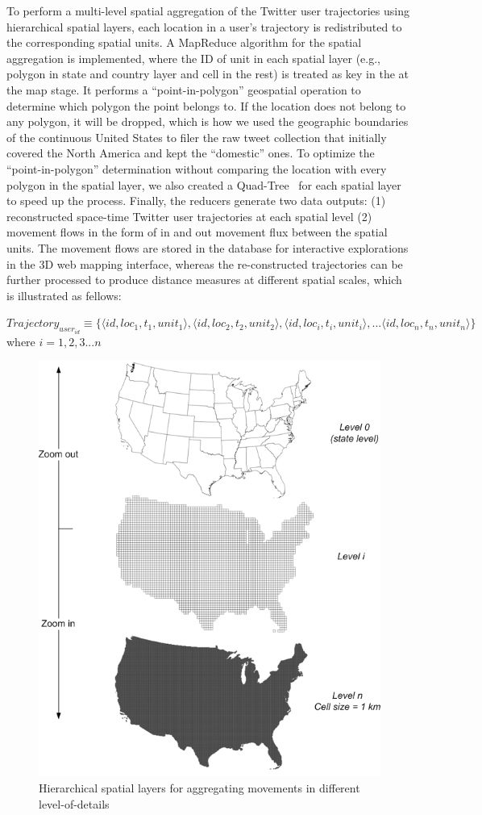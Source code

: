 \documentclass[ijgi,article,accept,moreauthors,pdftex,10pt,a4paper]{mdpi}
\theoremstyle{mdpi}
\newcounter{thm}
\newcounter{ex}
\newcounter{re}
\theoremstyle{mdpidefinition}
\begin{document}
To perform a multi-level spatial aggregation of the Twitter user trajectories using hierarchical spatial layers, each location in a user's trajectory is redistributed to the corresponding spatial units.
A MapReduce algorithm for the spatial aggregation is implemented, where the ID of unit in each spatial layer (e.g., polygon in state and country layer and cell in the rest) is treated as key in the at the map stage.
It performs a ``point-in-polygon'' geospatial operation to determine which polygon the point belongs to.
If the location does not belong to any polygon, it will be dropped, which is how we used the geographic boundaries of the continuous United States to filer the raw tweet collection that initially covered the North America and kept the ``domestic'' ones.
To optimize the ``point-in-polygon'' determination without comparing the location with every polygon in the spatial layer, we also created a Quad-Tree~\cite{samet1984quadtree} for each spatial layer to speed up the process.
Finally, the reducers generate two data outputs: (1) reconstructed space-time Twitter user trajectories at each spatial level (2) movement flows in the form of in and out movement flux between the spatial units.
The movement flows are stored in the database for interactive explorations in the 3D web mapping interface, whereas the re-constructed trajectories can be further processed to produce distance measures at different spatial scales, which is illustrated as fellows:
\newline

\noindent $Trajectory_{user_{id}} \equiv \lbrace \langle id, loc_{1}, t_{1}, unit_{1}\rangle, \langle id, loc_{2}, t_{2}, unit_{2}\rangle, \langle id, loc_{i}, t_{i}, unit_{i}\rangle, ... \langle id, loc_{n}, t_{n}, unit_{n}\rangle \rbrace$
where $ i = 1, 2, 3...n$

\begin{figure}[ht]
\centering
\includegraphics[width=0.6\linewidth]{./figures/multilevel}
\caption{Hierarchical spatial layers for aggregating movements in different level-of-details}
\label{fig:multilevel}
\end{figure}
\FloatBarrier
\end{document}
